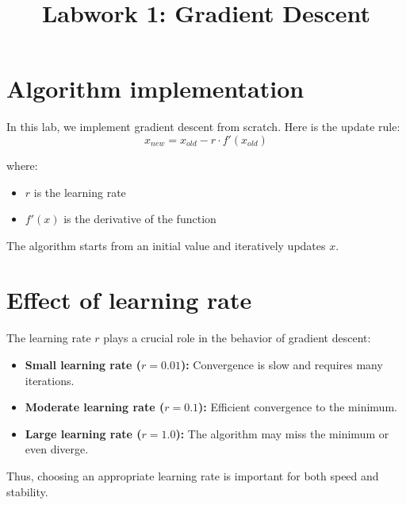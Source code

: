 \documentclass{article}
\title{Labwork 1: Gradient Descent}
\begin{document}
\maketitle

\section{Algorithm implementation}

In this lab, we implement gradient descent from scratch. Here is the update rule:
$$x_{new} = x_{old} - r \cdot f'(x_{old})$$

where:
\begin{itemize}
\item $r$ is the learning rate
\item $f'(x)$ is the derivative of the function
\end{itemize}

The algorithm starts from an initial value and iteratively updates $x$.


\section{Effect of learning rate}

The learning rate $r$ plays a crucial role in the behavior of gradient descent:

\begin{itemize}
\item \textbf{Small learning rate ($r = 0.01$):}
Convergence is slow and requires many iterations.


\item \textbf{Moderate learning rate ($r = 0.1$):} 
Efficient convergence to the minimum.

\item \textbf{Large learning rate ($r = 1.0$):} 
The algorithm may miss the minimum or even diverge.


\end{itemize}

Thus, choosing an appropriate learning rate is important for both speed and stability.
\end{document}
